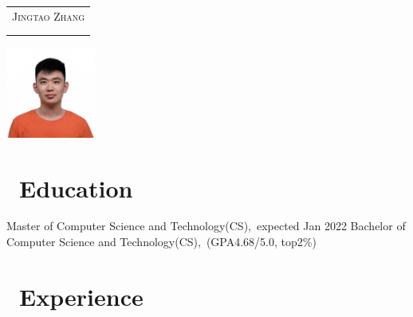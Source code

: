 \documentclass{resume}
\begin{document}

\begin{minipage}{0.7\textwidth}
  \Large{
    \begin{tabu}  { l }
      \scshape{Jingtao Zhang} \\
       \\
       \\
    \end{tabu}
  }
\end{minipage}
\begin{minipage}{0.3\textwidth}
  \raggedleft
  \includegraphics[height=30mm]{avatar}
\end{minipage}

\section{\faGraduationCap\ Education}
Master of Computer Science and Technology(CS),\ expected Jan 2022
Bachelor of Computer Science and Technology(CS),\ (GPA4.68/5.0, top2\%)

\section{\faUsers\ Experience}
\end{document}
